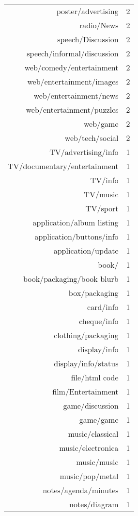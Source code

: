 \begin{longtable}{rr}
      poster/advertising &   2 \\ 
      radio/News &   2 \\ 
      speech/Discussion &   2 \\ 
      speech/informal/discussion &   2 \\ 
      web/comedy/entertainment &   2 \\ 
      web/entertainment/images &   2 \\ 
      web/entertainment/news &   2 \\ 
      web/entertainment/puzzles &   2 \\ 
      web/game &   2 \\ 
      web/tech/social &   2 \\ 
      TV/advertising/info &   1 \\ 
      TV/documentary/entertainment &   1 \\ 
      TV/info &   1 \\ 
      TV/music &   1 \\ 
      TV/sport &   1 \\ 
      application/album listing &   1 \\ 
      application/buttons/info &   1 \\ 
      application/update &   1 \\ 
      book/ &   1 \\ 
      book/packaging/book blurb &   1 \\ 
      box/packaging &   1 \\ 
      card/info &   1 \\ 
      cheque/info &   1 \\ 
      clothing/packaging &   1 \\ 
      display/info &   1 \\ 
      display/info/status &   1 \\ 
      file/html code &   1 \\ 
      film/Entertainment &   1 \\ 
      game/discussion &   1 \\ 
      game/game &   1 \\ 
      music/classical &   1 \\ 
      music/electronica &   1 \\ 
      music/music &   1 \\ 
      music/pop/metal &   1 \\ 
      notes/agenda/minutes &   1 \\ 
      notes/diagram &   1 \\ 

\end{longtable}
